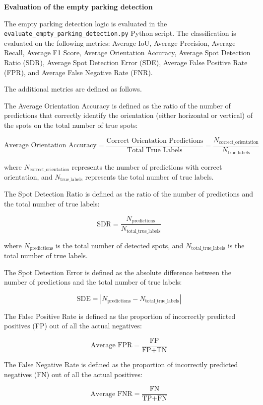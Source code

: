 \textbf{Evaluation of the empty parking detection}

The empty parking detection logic is evaluated in the
\texttt{evaluate\_empty\_parking\_detection.py} Python script. The
classification is evaluated on the following metrics: Average IoU, Average
Precision, Average Recall, Average F1 Score, Average Orientation Accuracy,
Average Spot Detection Ratio (SDR), Average Spot Detection Error (SDE), Average
False Positive Rate (FPR), and Average False Negative Rate (FNR).

The additional metrics are defined as follows.

The Average Orientation Accuracy is defined as the ratio of the number of
predictions that correctly identify the orientation (either horizontal or
vertical) of the spots on the total number of true spots:

\[
  \text{Average Orientation Accuracy} = \frac{\text{Correct Orientation Predictions}}{\text{Total True Labels}}
  = \frac{N_{\text{correct\_orientation}}}{N_{\text{true\_labels}}}
\]

where \( N_{\text{correct\_orientation}} \) represents the number of predictions
with correct orientation, and \( N_{\text{true\_labels}} \) represents the total
number of true labels.

The Spot Detection Ratio is defined as the ratio of the number of predictions
and the total number of true labels:

\[
  \text{SDR} = \frac{N_{\text{predictions}}}{N_{\text{total\_true\_labels}}}
\]

where \( N_{\text{predictions}} \) is the total number of detected spots, and \(
N_{\text{total\_true\_labels}} \) is the total number of true labels.

The Spot Detection Error is defined as the absolute difference between the
number of predictions and the total number of true labels:

\[
  \text{SDE} = |N_{\text{predictions}} - N_{\text{total\_true\_labels}}|
\]

The False Positive Rate is defined as the proportion of incorrectly predicted
positives (FP) out of all the actual negatives:

\[
  \text{Average FPR} = \frac{\text{FP}}{\text{FP} + \text{TN}}
\]

The False Negative Rate is defined as the proportion of incorrectly predicted
negatives (FN) out of all the actual positives:

\[
  \text{Average FNR} = \frac{\text{FN}}{\text{TP} + \text{FN}}
\]

